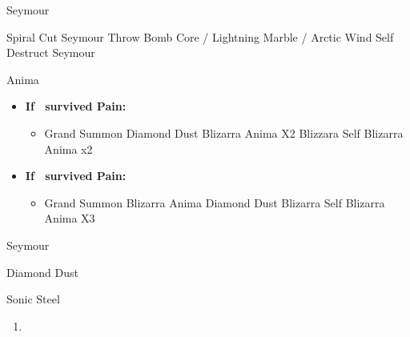 \begin{battle}[3000]{Seymour}
	\begin{itemize}
		\tidusf Spiral Cut Seymour
		\switch{\yuna}{\rikku}
		\rikkuf Throw Bomb Core / Lightning Marble / Arctic Wind
		\kimahrif Self Destruct Seymour
	\end{itemize}
\end{battle}
\begin{battle}[18000]{Anima}
	\begin{itemize}
		\rikkuf Steal
		\enemyf Pain
		\item \textbf{If \rikku\ survived Pain:}
		\begin{itemize}
			\switch{\rikku}{\yuna}
			\item Grand Summon \shiva
			\shivaf Diamond Dust
			\shivaf Blizarra Anima X2
			\shivaf Blizzara Self
			\shivaf Blizarra Anima x2
		\end{itemize}
		\item \textbf{If \tidus\ survived Pain:}
		\begin{itemize}
			\switch{\tidus}{\yuna}
			\item Grand Summon \shiva
			\shivaf Blizarra Anima
			\shivaf Diamond Dust
			\shivaf Blizarra Self
			\shivaf Blizarra Anima X3
		\end{itemize}
	\end{itemize}
\end{battle}
\begin{battle}[6000]{Seymour}
	\begin{itemize}
		\shivaf Diamond Dust
	\end{itemize}
\end{battle}
\begin{equip}
	\begin{itemize}
		\tidusf Sonic Steel
	\end{itemize}
\end{equip}
\winvfill
\begin{enumerate}[resume]
	\item \formation{\tidus}{\rikku}{\yuna}
\end{enumerate}
